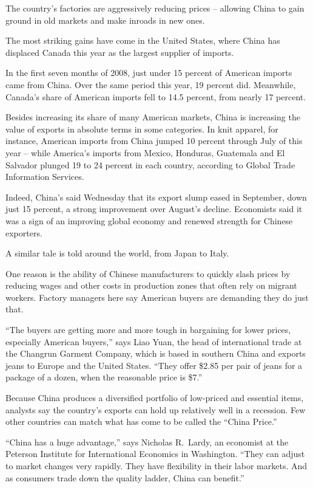 ﻿\documentclass[12pt]{article}
\begin{document}
The country's factories are aggressively reducing prices -- allowing China to gain ground in old
markets and make inroads in new ones.

The most striking gains have come in the United States, where China has displaced Canada this year
as the largest supplier of imports.

In the first seven months of 2008, just under 15 percent of American imports came from China. Over
the same period this year, 19 percent did. Meanwhile, Canada's share of American imports fell to
14.5 percent, from nearly 17 percent.

Besides increasing its share of many American markets, China is increasing the value of exports in
absolute terms in some categories. In knit apparel, for instance, American imports from China jumped
10 percent through July of this year -- while America's imports from Mexico, Honduras, Guatemala and
El Salvador plunged 19 to 24 percent in each country, according to Global Trade Information
Services.

Indeed, China's said Wednesday that its export slump eased in September, down just 15 percent, a
strong improvement over August's decline. Economists said it was a sign of an improving global
economy and renewed strength for Chinese exporters.

A similar tale is told around the world, from Japan to Italy.

One reason is the ability of Chinese manufacturers to quickly slash prices by reducing wages and
other costs in production zones that often rely on migrant workers. Factory managers here say
American buyers are demanding they do just that.

``The buyers are getting more and more tough in bargaining for lower prices, especially American
buyers,'' says Liao Yuan, the head of international trade at the Changrun Garment Company, which is
based in southern China and exports jeans to Europe and the United States. ``They offer \$2.85 per
pair of jeans for a package of a dozen, when the reasonable price is \$7.''

Because China produces a diversified portfolio of low-priced and essential items, analysts say the
country's exports can hold up relatively well in a recession. Few other countries can match what has
come to be called the ``China Price.''

``China has a huge advantage,'' says Nicholas R.~Lardy, an economist at the Peterson Institute for
International Economics in Washington. ``They can adjust to market changes very rapidly. They have
flexibility in their labor markets. And as consumers trade down the quality ladder, China can
benefit.''
\end{document}
